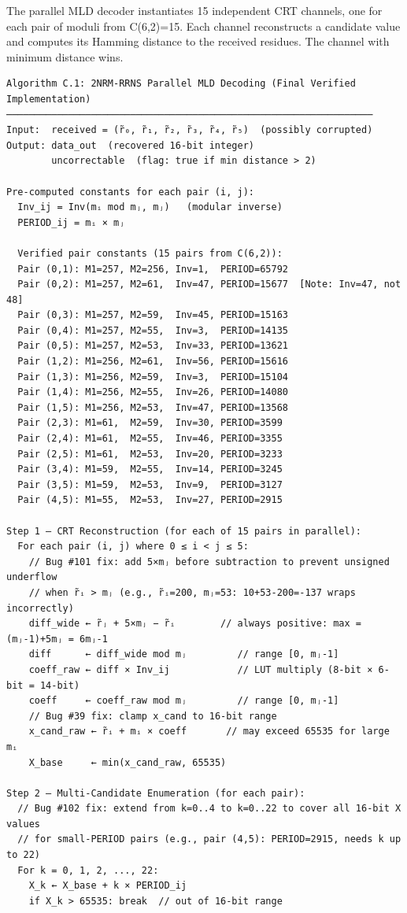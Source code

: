 The parallel MLD decoder instantiates 15 independent CRT channels, one
for each pair of moduli from C(6,2)=15. Each channel reconstructs a
candidate value and computes its Hamming distance to the received
residues. The channel with minimum distance wins.

\begin{verbatim}
Algorithm C.1: 2NRM-RRNS Parallel MLD Decoding (Final Verified Implementation)
─────────────────────────────────────────────────────────────────
Input:  received = (r̃₀, r̃₁, r̃₂, r̃₃, r̃₄, r̃₅)  (possibly corrupted)
Output: data_out  (recovered 16-bit integer)
        uncorrectable  (flag: true if min distance > 2)

Pre-computed constants for each pair (i, j):
  Inv_ij = Inv(mᵢ mod mⱼ, mⱼ)   (modular inverse)
  PERIOD_ij = mᵢ × mⱼ

  Verified pair constants (15 pairs from C(6,2)):
  Pair (0,1): M1=257, M2=256, Inv=1,  PERIOD=65792
  Pair (0,2): M1=257, M2=61,  Inv=47, PERIOD=15677  [Note: Inv=47, not 48]
  Pair (0,3): M1=257, M2=59,  Inv=45, PERIOD=15163
  Pair (0,4): M1=257, M2=55,  Inv=3,  PERIOD=14135
  Pair (0,5): M1=257, M2=53,  Inv=33, PERIOD=13621
  Pair (1,2): M1=256, M2=61,  Inv=56, PERIOD=15616
  Pair (1,3): M1=256, M2=59,  Inv=3,  PERIOD=15104
  Pair (1,4): M1=256, M2=55,  Inv=26, PERIOD=14080
  Pair (1,5): M1=256, M2=53,  Inv=47, PERIOD=13568
  Pair (2,3): M1=61,  M2=59,  Inv=30, PERIOD=3599
  Pair (2,4): M1=61,  M2=55,  Inv=46, PERIOD=3355
  Pair (2,5): M1=61,  M2=53,  Inv=20, PERIOD=3233
  Pair (3,4): M1=59,  M2=55,  Inv=14, PERIOD=3245
  Pair (3,5): M1=59,  M2=53,  Inv=9,  PERIOD=3127
  Pair (4,5): M1=55,  M2=53,  Inv=27, PERIOD=2915

Step 1 — CRT Reconstruction (for each of 15 pairs in parallel):
  For each pair (i, j) where 0 ≤ i < j ≤ 5:
    // Bug #101 fix: add 5×mⱼ before subtraction to prevent unsigned underflow
    // when r̃ᵢ > mⱼ (e.g., r̃ᵢ=200, mⱼ=53: 10+53-200=-137 wraps incorrectly)
    diff_wide ← r̃ⱼ + 5×mⱼ − r̃ᵢ        // always positive: max = (mⱼ-1)+5mⱼ = 6mⱼ-1
    diff      ← diff_wide mod mⱼ         // range [0, mⱼ-1]
    coeff_raw ← diff × Inv_ij            // LUT multiply (8-bit × 6-bit = 14-bit)
    coeff     ← coeff_raw mod mⱼ         // range [0, mⱼ-1]
    // Bug #39 fix: clamp x_cand to 16-bit range
    x_cand_raw ← r̃ᵢ + mᵢ × coeff       // may exceed 65535 for large mᵢ
    X_base     ← min(x_cand_raw, 65535)

Step 2 — Multi-Candidate Enumeration (for each pair):
  // Bug #102 fix: extend from k=0..4 to k=0..22 to cover all 16-bit X values
  // for small-PERIOD pairs (e.g., pair (4,5): PERIOD=2915, needs k up to 22)
  For k = 0, 1, 2, ..., 22:
    X_k ← X_base + k × PERIOD_ij
    if X_k > 65535: break  // out of 16-bit range


\end{verbatim}
